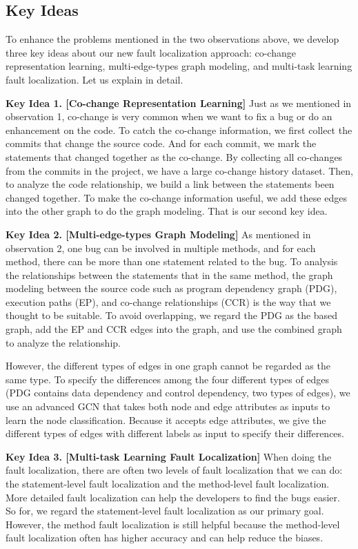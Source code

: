 \subsection{Key Ideas}
\label{sec:key-ideas}

To enhance the problems mentioned in the two observations above, we develop three key ideas about our new fault localization approach: co-change representation learning, multi-edge-types graph modeling, and multi-task learning fault localization. Let us explain in detail.

{\bf Key Idea 1. [Co-change Representation Learning]} Just as we mentioned in observation 1, co-change is very common when we want to fix a bug or do an enhancement on the code. To catch the co-change information, we first collect the commits that change the source code. And for each commit, we mark the statements that changed together as the co-change. By collecting all co-changes from the commits in the project, we have a large co-change history dataset. Then, to analyze the code relationship, we build a link between the statements been changed together. To make the co-change information useful, we add these edges into the other graph to do the graph modeling. That is our second key idea.

{\bf Key Idea 2. [Multi-edge-types Graph Modeling]} As mentioned in observation 2, one bug can be involved in multiple methods, and for each method, there can be more than one statement related to the bug. To analysis the relationships between the statements that in the same method, the graph modeling between the source code such as program dependency graph (PDG), execution paths (EP), and co-change relationships (CCR) is the way that we thought to be suitable. To avoid overlapping, we regard the PDG as the based graph, add the EP and CCR edges into the graph, and use the combined graph to analyze the relationship. 

However, the different types of edges in one graph cannot be regarded as the same type. To specify the differences among the four different types of edges (PDG contains data dependency and control dependency, two types of edges), we use an advanced GCN \cite{li2019gcn} that takes both node and edge attributes as inputs to learn the node classification. Because it accepts edge attributes, we give the different types of edges with different labels as input to specify their differences.


{\bf Key Idea 3. [Multi-task Learning Fault Localization]} When doing the fault localization, there are often two levels of fault localization that we can do: the statement-level fault localization and the method-level fault localization. More detailed fault localization can help the developers to find the bugs easier. So for\tool, we regard the statement-level fault localization as our primary goal. However, the method fault localization is still helpful because the method-level fault localization often has higher accuracy and can help reduce the biases. 


